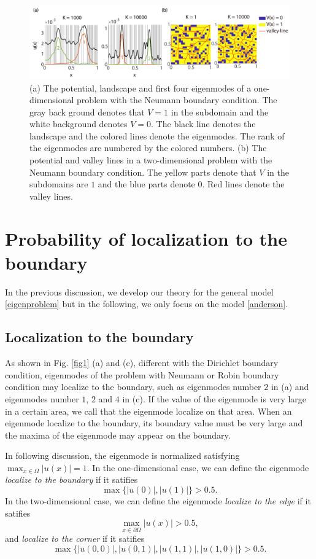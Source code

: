\documentclass[a4paper,11pt]{article}
\begin{document}
\begin{figure}
\centering
\includegraphics[width=\linewidth]{Fig2}
\caption{(a) The potential, landscape and first four eigenmodes of a one-dimensional problem with the Neumann boundary condition. The gray back ground denotes that $V = 1$ in the subdomain and the white background denotes $V = 0$. The black line denotes the landscape and the colored lines denote the eigenmodes. The rank of the eigenmodes are numbered by the colored numbers. (b) The potential and valley lines in a two-dimensional problem with the Neumann boundary condition. The yellow parts denote that $V$ in the subdomains are $1$ and the blue parts denote $0$. Red lines denote the valley lines.}
\label{fig2}
\end{figure}


\section{Probability of localization to the boundary}

In the previous discussion, we develop our theory for the general model \eqref{eigenproblem} but in the following, we only focus on the model \eqref{anderson}.

\subsection{Localization to the boundary}

As shown in Fig. \ref{fig1} (a) and (c), different with the Dirichlet boundary condition, eigenmodes of the problem with Neumann or Robin boundary condition may localize to the boundary, such as eigenmodes number $2$ in (a) and eigenmodes number $1$, $2$ and $4$ in (c). If the value of the eigenmode is very large in a certain area, we call that the eigenmode localize on that area. When an eigenmode localize to the boundary, its boundary value must be very large and the maxima of the eigenmode may appear on the boundary.

In following discussion, the eigenmode is normalized satisfying $\max_{x \in \Omega} |u(x)| = 1$. In the one-dimensional case, we can define the eigenmode \emph{localize to the boundary} if it satifies
\begin{equation}\label{probbound}
\max\{|u(0)|, |u(1)|\} > 0.5.
\end{equation}
In the two-dimensional case, we can define the eigenmode \emph{localize to the edge} if it satifies
\begin{equation}\label{probedge}
\max_{x \in \partial \Omega} |u(x)| > 0.5,
\end{equation}
and \emph{localize to the corner} if it satifies
\begin{equation}\label{probcorner}
\max\{|u(0,0)|, |u(0,1)|, |u(1,1)|, |u(1,0)|\} > 0.5.
\end{equation}
\end{document}
